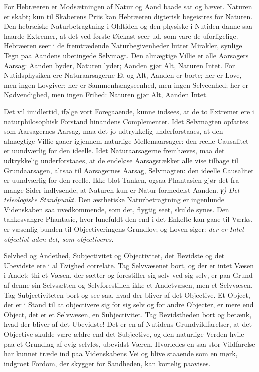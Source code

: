 \documentclass[12pt,a4paper]{book}
\newcommand{\subrunin}[1]{\emph{#1}\hspace{0.4em}}
\begin{document}
For Hebræeren er Modsætningen af Natur og Aand baade sat og hævet. Naturen
er skabt; kun til Skaberens Priis kan Hebræeren digterisk begeistres for
Naturen. Den hebræiske Naturbetragtning i Oldtiden og den physiske i
Nutiden danne saa haarde Extremer, at det ved første Øiekast seer ud, som
vare de uforligelige. Hebræeren seer i de fremtrædende Naturbegivenheder
lutter Mirakler, synlige Tegn paa Aandens ubetingede Selvmagt. Den
almægtige Villie er alle Aarsagers Aarsag: Aanden byder, Naturen lyder;
Aanden gjør Alt, Naturen Intet. For Nutidsphysiken ere Naturaarsagerne Et
og Alt, Aanden er borte; her er Love, men ingen Lovgiver; her er
Sammenhængseenhed, men ingen Selveenhed; her er Nødvendighed, men ingen
Frihed: Naturen gjør Alt, Aanden Intet.

Det vil imidlertid, ifølge vort Foregaaende, kunne indsees, at de to
Extremer ere i naturphilosophisk Forstand hinandens Complementer. Idet
Selvmagten opfattes som Aarsagernes Aarsag, maa det jo udtrykkelig
underforstaaes, at den almægtige Villie gaaer igjennem naturlige
Mellemaarsager: den reelle Causalitet er uundværlig for den ideelle. Idet
Naturaarsagerne fremhæves, maa det udtrykkelig underforstaaes, at de
endeløse Aarsagsrækker alle vise tilbage til Grundaarsagen, altsaa til
Aarsagernes Aarsag, Selvmagten: den ideelle Causalitet er uundværlig for
den reelle. Ikke blot Tanken, ogsaa Phantasien gjør det fra mange Sider
indlysende, at Naturen kun er Natur formedelst Aanden.
\subrunin{γ) Det teleologiske Standpunkt.} Den æsthetiske Naturbetragtning
er ingenlunde Videnskaben saa uvedkommende, som det, flygtig seet, skulde
synes. Den tankesvangre Phantasie, hvor lunefuldt den end i det Enkelte
kan gaae til Værks, er væsenlig bunden til Objectiveringens Grundlov; og
Loven siger: \emph{der er Intet objectivt uden det, som objectiveres.}

Selvhed og Andethed, Subjectivitet og Objectivitet, det Bevidste og det
Ubevidste ere i al Evighed correlate. Tag Selvvæsenet bort, og der er
intet Væsen i Andet; thi et Væsen, der sætter og forestiller sig selv ved
sig selv, er paa Grund af denne sin Selvsætten og Selvforestillen ikke et
Andetvæsen, men et Selvvæsen. Tag Subjectiviteten bort og see saa, hvad
der bliver af det Objective. Et Object, der er i Stand til at objectivere
sig for sig selv og for andre Objecter, er mere end Object, det er et
Selvvæsen, en Subjectivitet. Tag Bevidstheden bort og betænk, hvad der
bliver af det Ubevidste! Det er en af Nutidens Grundvildfarelser, at det
Objective skulde være ældre end det Subjective, og den naturlige Verden
hvile paa et Grundlag af evig selvløs, ubevidst Væren. Hvorledes en saa
stor Vildfarelse har kunnet træde ind paa Videnskabens Vei og blive
staaende som en mørk, indgroet Fordom, der skygger for Sandheden, kan
kortelig paavises.
\end{document}
